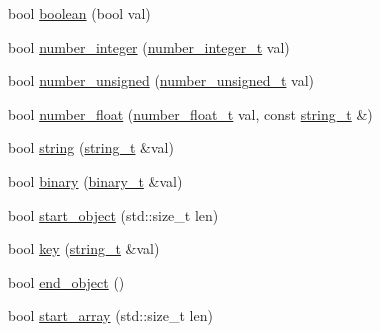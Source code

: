 \begin{DoxyCompactItemize}
\item 
bool \hyperlink{classnlohmann_1_1detail_1_1json__sax__dom__callback__parser_ab7d8db672189164a8c0731e65ada1b45}{boolean} (bool val)
\item 
bool \hyperlink{classnlohmann_1_1detail_1_1json__sax__dom__callback__parser_a68d9eddfd572e8687c1c8107e0505aa6}{number\+\_\+integer} (\hyperlink{classnlohmann_1_1detail_1_1json__sax__dom__callback__parser_a3ba8fc7a8d83c5b0eeb3b543ad844b8d}{number\+\_\+integer\+\_\+t} val)
\item 
bool \hyperlink{classnlohmann_1_1detail_1_1json__sax__dom__callback__parser_acabb231463bf669441c22e4ea385a9fb}{number\+\_\+unsigned} (\hyperlink{classnlohmann_1_1detail_1_1json__sax__dom__callback__parser_a2406c5125f7128fb9c01921df2903001}{number\+\_\+unsigned\+\_\+t} val)
\item 
bool \hyperlink{classnlohmann_1_1detail_1_1json__sax__dom__callback__parser_ae21f7872c334c77d03ae033cb0749b1c}{number\+\_\+float} (\hyperlink{classnlohmann_1_1detail_1_1json__sax__dom__callback__parser_a914ea0555cea5290449fb791ae41c655}{number\+\_\+float\+\_\+t} val, const \hyperlink{classnlohmann_1_1detail_1_1json__sax__dom__callback__parser_a00e7d95d82d5d8a43421526a42a8eabc}{string\+\_\+t} \&)
\item 
bool \hyperlink{classnlohmann_1_1detail_1_1json__sax__dom__callback__parser_ad94e912a67c7b96158937236805b8b47}{string} (\hyperlink{classnlohmann_1_1detail_1_1json__sax__dom__callback__parser_a00e7d95d82d5d8a43421526a42a8eabc}{string\+\_\+t} \&val)
\item 
bool \hyperlink{classnlohmann_1_1detail_1_1json__sax__dom__callback__parser_a66f5515cddef5074c9499f21c26ac099}{binary} (\hyperlink{classnlohmann_1_1detail_1_1json__sax__dom__callback__parser_a5af8493f830eeb1a79c69fc39ed54ef8}{binary\+\_\+t} \&val)
\item 
bool \hyperlink{classnlohmann_1_1detail_1_1json__sax__dom__callback__parser_a040e60243cc7c18a6078c6b83cdb4a81}{start\+\_\+object} (std\+::size\+\_\+t len)
\item 
bool \hyperlink{classnlohmann_1_1detail_1_1json__sax__dom__callback__parser_a0cc4a5192fe9b803276edb831b6099fa}{key} (\hyperlink{classnlohmann_1_1detail_1_1json__sax__dom__callback__parser_a00e7d95d82d5d8a43421526a42a8eabc}{string\+\_\+t} \&val)
\item 
bool \hyperlink{classnlohmann_1_1detail_1_1json__sax__dom__callback__parser_ae75d313d6d1b9c29508e740a10fefa18}{end\+\_\+object} ()
\item 
bool \hyperlink{classnlohmann_1_1detail_1_1json__sax__dom__callback__parser_a5255b98ba8282e3625968f91cff9d3d0}{start\+\_\+array} (std\+::size\+\_\+t len)

\end{DoxyCompactItemize}

